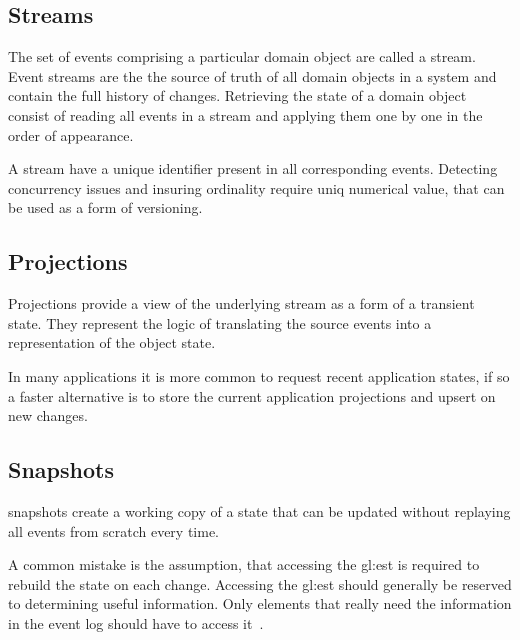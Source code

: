 
\subsection{Streams}

The set of events comprising a particular domain object are called a stream. Event streams are the the source of truth of all domain objects in a system and contain the full history of changes. Retrieving the state of a domain object consist of reading all events in a stream and applying them one by one in the order of appearance.

A stream have a unique identifier present in all corresponding events. Detecting concurrency issues and insuring ordinality require uniq numerical value, that can be used as a form of versioning.

\subsection{Projections}

Projections provide a view of the underlying stream as a form of a transient state. They represent the logic of translating the source events into a representation of the object state.

In many applications it is more common to request recent application states, if so a faster alternative is to store the current application projections and upsert on new changes.

\subsection{Snapshots}\label{subsec:snap}

snapshots create a working copy of a state that can be updated without replaying all events from scratch every time.

A common mistake is the assumption, that accessing the \gls{gl:est} is required to rebuild the state on each change. Accessing the \gls{gl:est} should generally be reserved to determining useful information. Only elements that really need the information in the event log should have to access it~\citep{esvsed}.

